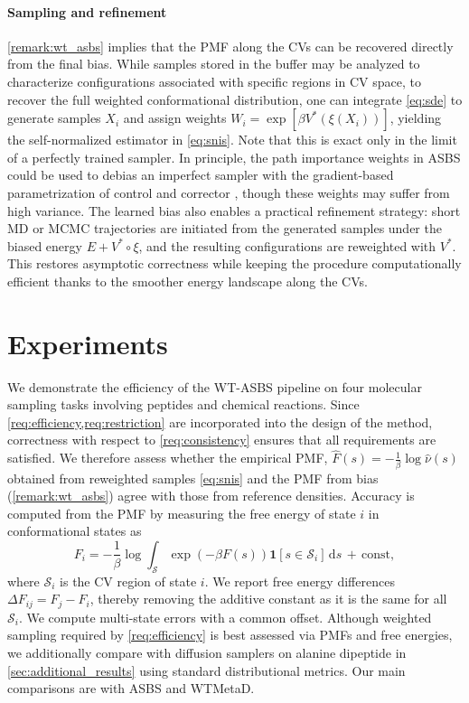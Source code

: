 \documentclass[]{fairmeta}
\theoremstyle{remark}
\begin{document}
\paragraph{Sampling and refinement}
\cref{remark:wt_asbs} implies that the PMF along the CVs can be recovered directly from the final bias.
While samples stored in the buffer may be analyzed to characterize configurations associated with specific regions in CV space, to recover the full weighted conformational distribution, one can integrate \cref{eq:sde} to generate samples $X_i$ and assign weights $W_i = \exp[\beta V^\ast(\xi(X_i))]$, yielding the self-normalized estimator in \cref{eq:snis}.
Note that this is exact only in the limit of a perfectly trained sampler.
In principle, the path importance weights in ASBS could be used to debias an imperfect sampler with the gradient-based parametrization of control and corrector \citep{liu2025adjoint}, though these weights may suffer from high variance.
The learned bias also enables a practical refinement strategy: short MD or MCMC trajectories are initiated from the generated samples under the biased energy $E + V^\ast \circ \xi$, and the resulting configurations are reweighted with $V^\ast$.
This restores asymptotic correctness while keeping the procedure computationally efficient thanks to the smoother energy landscape along the CVs.


\section{Experiments}
\label{sec:experiments}

We demonstrate the efficiency of the WT-ASBS pipeline on four molecular sampling tasks involving peptides and chemical reactions.
Since \cref{req:efficiency,req:restriction} are incorporated into the design of the method, correctness with respect to \cref{req:consistency} ensures that all requirements are satisfied.
We therefore assess whether the empirical PMF, $\hat{F}(s) = -\frac{1}{\beta} \log \hat{\nu}(s)$ obtained from reweighted samples \cref{eq:snis} and the PMF from bias (\cref{remark:wt_asbs}) agree with those from reference densities.
Accuracy is computed from the PMF by measuring the free energy of state $i$ in conformational states as
\begin{equation}
F_i = -\frac{1}{\beta} \log \int_\mathcal{S} \exp(-\beta F(s)) \bm{1}[s \in \mathcal{S}_i] \, \mathrm{d}s \, + \, \mathrm{const},
\label{eq:dF}
\end{equation}
where $\mathcal{S}_i$ is the CV region of state $i$.
We report free energy differences $\Delta F_{ij} = F_j - F_i$, thereby removing the additive constant as it is the same for all $\mathcal{S}_{i}$. We compute multi-state errors with a common offset.
Although weighted sampling required by \cref{req:efficiency} is best assessed via PMFs and free energies, we additionally compare with diffusion samplers on alanine dipeptide in \cref{sec:additional_results} using standard distributional metrics. Our main comparisons are with ASBS and WTMetaD.
\end{document}
